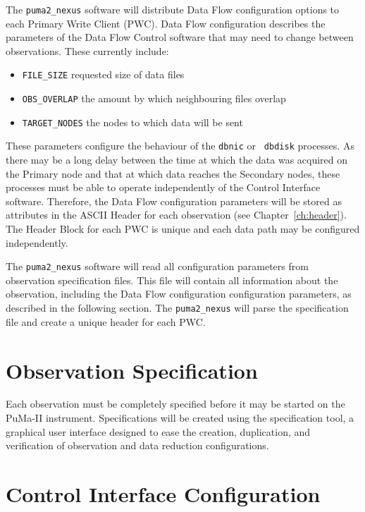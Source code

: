 The {\tt puma2\_nexus} software will distribute Data Flow configuration
options to each Primary Write Client (PWC).  Data Flow configuration
describes the parameters of the Data Flow Control software that may
need to change between observations.  These currently
include:
\begin{itemize}
\item{\tt FILE\_SIZE} requested size of data files
\item{\tt OBS\_OVERLAP} the amount by which neighbouring files overlap
\item{\tt TARGET\_NODES} the nodes to which data will be sent
\end{itemize}
These parameters configure the behaviour of the {\tt dbnic} or {\tt
dbdisk} processes.  As there may be a long delay between the time at
which the data was acquired on the Primary node and that at which data
reaches the Secondary nodes, these processes must be able to operate
independently of the Control Interface software.  Therefore, the
Data Flow configuration parameters will be stored as attributes in the
ASCII Header for each observation (see Chapter~\ref{ch:header}).  The
Header Block for each PWC is unique and each data
path may be configured independently.

The {\tt puma2\_nexus} software will read all configuration parameters
from observation specification files.  This file will contain all
information about the observation, including the Data Flow
configuration configuration parameters, as described in the following
section.  The {\tt puma2\_nexus} will parse the specification file and
create a unique header for each PWC.

\section{Observation Specification}

Each observation must be completely specified before it may be started
on the PuMa-II instrument.  Specifications will be created using the
specification tool, a graphical user interface designed to ease the
creation, duplication, and verification of observation and data
reduction configurations.

\section{Control Interface Configuration}

